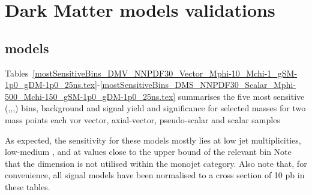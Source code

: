 \section{Dark Matter models validations}
\label{sec:dm_checklist}

\subsection{\DMj models}

Tables~\ref{mostSensitiveBins_DMV_NNPDF30_Vector_Mphi-10_Mchi-1_gSM-1p0_gDM-1p0_25ns.tex}-\ref{mostSensitiveBins_DMS_NNPDF30_Scalar_Mphi-500_Mchi-150_gSM-1p0_gDM-1p0_25ns.tex} summarises the five most sensitive (\njet,\nb,\scalht,\mht) bins, background and signal yield and significance for selected \DMbb masses for two mass points each vor vector, axial-vector, pseudo-scalar and scalar samples

As expected, the sensitivity for these models mostly lies at low jet
multiplicities, low-medium \scalht, and at \mht values close to the upper bound
of the relevant \scalht bin Note that the \mht dimension is not utilised within 
the monojet category. Also note that, for convenience, all signal models have 
been normalised to a cross section of 10 pb in these tables.




\\
\\

\\
\\

\\
\\


\\
\\




